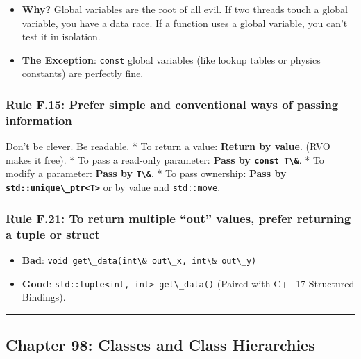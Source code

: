 \begin{itemize}
\tightlist
\item
  \textbf{Why?} Global variables are the root of all evil. If two
  threads touch a global variable, you have a data race. If a function
  uses a global variable, you can't test it in isolation.
\item
  \textbf{The Exception}: \passthrough{\lstinline!const!} global
  variables (like lookup tables or physics constants) are perfectly
  fine.
\end{itemize}

\hypertarget{rule-f.15-prefer-simple-and-conventional-ways-of-passing-information}{%
\subsubsection{Rule F.15: Prefer simple and conventional ways of passing
information}\label{rule-f.15-prefer-simple-and-conventional-ways-of-passing-information}}

Don't be clever. Be readable. * To return a value: \textbf{Return by
value}. (RVO makes it free). * To pass a read-only parameter:
\textbf{Pass by \passthrough{\lstinline!const T\&!}}. * To modify a
parameter: \textbf{Pass by \passthrough{\lstinline!T\&!}}. * To pass
ownership: \textbf{Pass by
\passthrough{\lstinline!std::unique\_ptr<T>!}} or by value and
\passthrough{\lstinline!std::move!}.

\hypertarget{rule-f.21-to-return-multiple-out-values-prefer-returning-a-tuple-or-struct}{%
\subsubsection{Rule F.21: To return multiple ``out'' values, prefer
returning a tuple or
struct}\label{rule-f.21-to-return-multiple-out-values-prefer-returning-a-tuple-or-struct}}

\begin{itemize}
\tightlist
\item
  \textbf{Bad}:
  \passthrough{\lstinline!void get\_data(int\& out\_x, int\& out\_y)!}
\item
  \textbf{Good}:
  \passthrough{\lstinline!std::tuple<int, int> get\_data()!} (Paired
  with C++17 Structured Bindings).
\end{itemize}

\begin{center}\rule{0.5\linewidth}{0.5pt}\end{center}

\hypertarget{chapter-98-classes-and-class-hierarchies}{%
\subsection{Chapter 98: Classes and Class
Hierarchies}\label{chapter-98-classes-and-class-hierarchies}}

